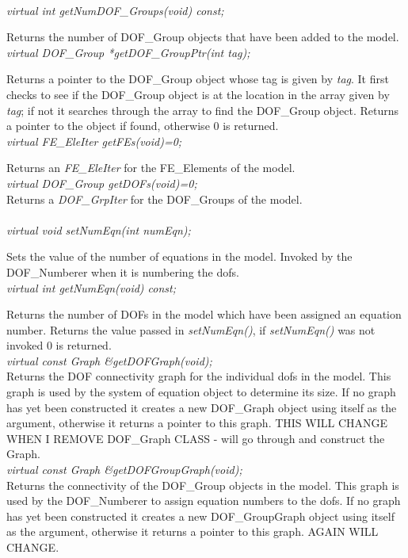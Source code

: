   \\
{\em virtual int getNumDOF\_Groups(void) const;}

Returns the number of DOF\_Group objects that have been added to the
model.\\

{\em virtual DOF\_Group *getDOF\_GroupPtr(int tag);}

Returns a pointer to the DOF\_Group object whose tag is given by {\em
tag}.  It first checks to see if the DOF\_Group object is at the
location in the array given by {\em tag}; if not it searches through
the array to find the DOF\_Group object. Returns a pointer to the
object if found, otherwise $0$ is returned.\\

{\em virtual FE\_EleIter getFEs(void)=0;} 

Returns an {\em FE\_EleIter} for the FE\_Elements of the model. \\

{\em virtual DOF\_Group getDOFs(void)=0;} \\
Returns a {\em DOF\_GrpIter} for the DOF\_Groups of the model. \\

  \\
{\em virtual void setNumEqn(int numEqn);} 

Sets the value of the number of equations in the model. Invoked by the
DOF\_Numberer when it is numbering the dofs. \\

{\em virtual int getNumEqn(void) const;} 

Returns the number of DOFs in the model which have been assigned
an equation number. Returns the value passed in {\em setNumEqn()},
if {\em setNumEqn()} was not invoked $0$ is returned.\\

{\em virtual const Graph \&getDOFGraph(void);} \\
Returns the DOF connectivity graph for the individual dofs in the
model. This graph is used by the system of equation object to
determine its size. If no graph has yet been constructed it creates
a new DOF\_Graph object using itself as the argument, otherwise it
returns a pointer to this graph. THIS WILL CHANGE WHEN I REMOVE
DOF\_Graph CLASS - will go through and construct the Graph.\\

{\em virtual const Graph \&getDOFGroupGraph(void);} \\
Returns the connectivity of the DOF\_Group objects in the model. 
This graph is used by the DOF\_Numberer to assign equation numbers to
the dofs. If no graph has yet been constructed it creates
a new DOF\_GroupGraph object using itself as the argument, otherwise it
returns a pointer to this graph. AGAIN WILL CHANGE.\\

